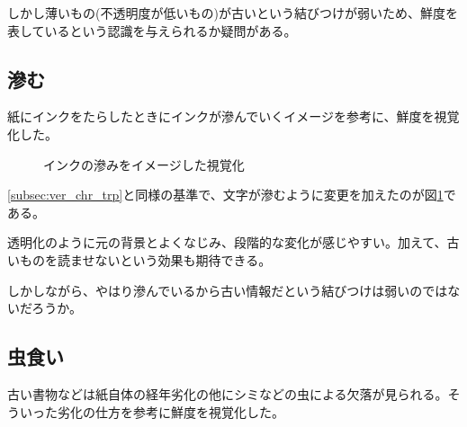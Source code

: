 しかし薄いもの(不透明度が低いもの)が古いという結びつけが弱いため、鮮度を表しているという認識を与えられるか疑問がある。

\subsection{滲む}
\label{subsec:ver_chr_bld}

紙にインクをたらしたときにインクが滲んでいくイメージを参考に、鮮度を視覚化した。

\begin{figure}[htbp]
  \begin{center}
  \end{center}
  \caption{インクの滲みをイメージした視覚化}
  \label{fig:ver_bleeding}
\end{figure}

\ref{subsec:ver_chr_trp}と同様の基準で、文字が滲むように変更を加えたのが図\ref{fig:ver_bleeding}である。

透明化のように元の背景とよくなじみ、段階的な変化が感じやすい。加えて、古いものを読ませないという効果も期待できる。

しかしながら、やはり滲んでいるから古い情報だという結びつけは弱いのではないだろうか。

\subsection{虫食い}
\label{subsec:ver_chr_wh}

古い書物などは紙自体の経年劣化の他にシミなどの虫による欠落が見られる。そういった劣化の仕方を参考に鮮度を視覚化した。

